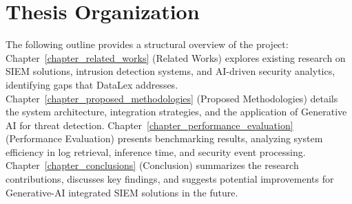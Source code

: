 \section{Thesis Organization}
\label{sec_thesis_organization}

The following outline provides a structural overview of the project: Chapter~\ref{chapter_related_works} (Related Works) explores existing research on SIEM solutions, intrusion detection systems, and AI-driven security analytics, identifying gaps that DataLex addresses. Chapter~\ref{chapter_proposed_methodologies} (Proposed Methodologies) details the system architecture, integration strategies, and the application of Generative AI for threat detection. Chapter~\ref{chapter_performance_evaluation} (Performance Evaluation) presents benchmarking results, analyzing system efficiency in log retrieval, inference time, and security event processing. Chapter~\ref{chapter_conclusions} (Conclusion) summarizes the research contributions, discusses key findings, and suggests potential improvements for Generative-AI integrated SIEM solutions in the future.
